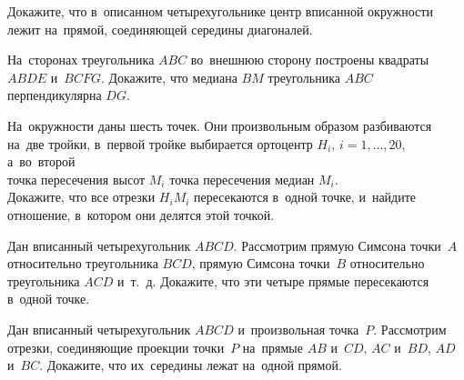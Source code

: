 \begin{problems}
\item
Докажите, что в~описанном четырехугольнике центр вписанной окружности лежит
на~прямой, соединяющей середины диагоналей.

\item
На~сторонах треугольника $ABC$ во~внешнюю сторону построены квадраты $ABDE$
и~$BCFG$.
Докажите, что медиана $BM$ треугольника $ABC$ перпендикулярна $DG$.

\item
На~окружности даны шесть точек.
Они произвольным образом разбиваются на~две тройки, в~первой тройке выбирается
ортоцентр $H_i$, $i = 1, \ldots, 20$, а~во~второй
\\
\sp точка пересечения высот $M_i$
\quad
\sp точка пересечения медиан $M_i$.
\\
Докажите, что все отрезки $H_i M_i$ пересекаются в~одной точке, и~найдите
отношение, в~котором они делятся этой точкой.

\item
Дан вписанный четырехугольник $ABCD$.
Рассмотрим прямую Симсона точки~$A$ относительно треугольника $BCD$,
прямую Симсона точки~$B$ относительно треугольника $ACD$ и~т.~д.
Докажите, что эти четыре прямые пересекаются в~одной точке.

\item
Дан вписанный четырехугольник $ABCD$ и~произвольная точка~$P$.
Рассмотрим отрезки, соединяющие проекции точки~$P$ на~прямые
$AB$ и~$CD$, $AC$ и~$BD$, $AD$ и~$BC$.
Докажите, что их~середины лежат на~одной прямой.

\end{problems}

\endgroup %

